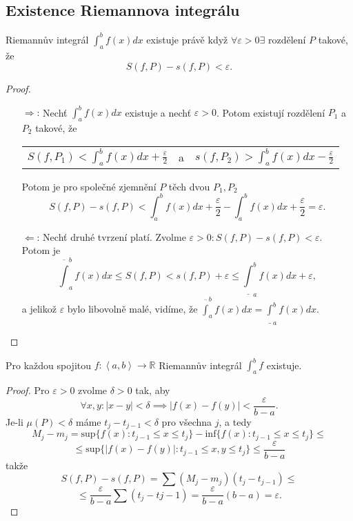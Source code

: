 \documentclass[../main.tex]{subfiles}
\begin{document}
\noindent
\subsection{Existence Riemannova integrálu}
\begin{theorem}
	Riemannův integrál $\int^b_a f(x) dx$ existuje právě když $\forall \varepsilon > 0 \exists$ rozdělení $P$ takové, že
	\[S(f,P) - s(f,P) < \varepsilon.\]
\end{theorem}

\begin{proof}
	\begin{enumerate}
		\item[$\Rightarrow$:] Nechť $\int^b_a f(x) dx$ existuje a nechť $\varepsilon > 0$. Potom existují rozdělení $P_1$ a $P_2$ takové, že
	    \begin{center}
	        \begin{tabular}{ c c c }
	            $S(f,P_1) < \int^b_a f(x) dx + \frac{\varepsilon}{2}$ & a & $s(f,P_2) > \int^b_a f(x) dx - \frac{\varepsilon}{2}$  \\
	        \end{tabular}
	    \end{center}
	    Potom je pro společné zjemnění $P$ těch dvou $P_1,P_2$
	    \[S(f,P) - s(f,P) < \int^b_a f(x)dx + \frac{\varepsilon}{2} - \int^b_a f(x)dx + \frac{\varepsilon}{2} = \varepsilon.\]
	    \item[$\Leftarrow$:] Nechť druhé tvrzení platí. Zvolme $\varepsilon > 0 : S(f,P) - s(f,P) < \varepsilon.$ Potom je 
	    \[\overline{\int}^b_a f(x)dx \leq S(f,P) < s(f,P) + \varepsilon \leq \underline{\int}^b_a f(x)dx + \varepsilon,\]
	    a jelikož $\varepsilon$ bylo libovolně malé, vidíme, že $\overline{\int}^b_a f(x)dx = \underline{\int}^b_a f(x)dx.$
	\end{enumerate}
\end{proof}

\begin{theorem}
	Pro každou spojitou $f : \left<a,b\right> \rightarrow \mathbb{R}$ Riemannův integrál $\int^b_a f$ existuje.
\end{theorem}

\begin{proof}
	Pro $\varepsilon > 0 $ zvolme $\delta > 0$ tak, aby 
	\[\forall x,y : |x-y| < \delta \implies |f(x) - f(y)| < \frac{\varepsilon}{b-a}.\]
	Je-li $\mu(P) < \delta$ máme $t_j-t_{j-1} < \delta$ pro všechna $j$, a tedy
	\[M_j - m_j = \text{sup}\{f(x) : t_{j-1} \leq x \leq t_j\} - \text{inf}\{f(x) : t_{j-1} \leq x \leq t_j\} \leq\]
	\[\leq \text{sup}\{|f(x) - f(y)| : t_{j-1} \leq x,y \leq t_j\} \leq \frac{\varepsilon}{b-a}\]
	takže
	\[S(f,P) - s(f,P) = \sum (M_j - m_j)(t_j-t_{j-1})\leq\]
	\[\leq \frac{\varepsilon}{b-a}\sum (t_j-t{j-1}) = \frac{\varepsilon}{b-a}(b-a) = \varepsilon.\]
\end{proof}
\end{document}
